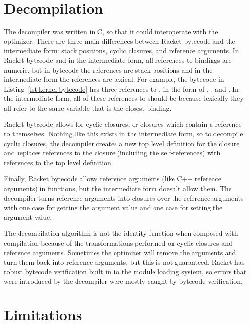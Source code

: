 \section{Decompilation}

The decompiler was written in C, so that it could interoperate with the optimizer.
There are three main differences between Racket bytecode and the intermediate form: stack positions, cyclic closures, and reference arguments.
In Racket bytecode and in the intermediate form, all references to bindings are numeric, but in bytecode the references are stack positions and in the intermediate form the references are lexical.
For example, the bytecode in Listing~\ref{lst:kernel-bytecode} has three references to , in the form of , , and . 
In the intermediate form, all of these references to  should be  because lexically they all refer to the same variable that is the closest binding.

Racket bytecode allows for cyclic closures, or closures which contain a reference to themselves.
Nothing like this exists in the intermediate form, so to decompile cyclic closures, the decompiler creates a new top level definition for the closure and replaces references to the closure (including the self-references) with references to the top level definition.

Finally, Racket bytecode allows reference arguments (like C++ reference arguments) in functions, but the intermediate form doesn't allow them.
The decompiler turns reference arguments into  closures over the reference arguments with one case for getting the argument value and one case for setting the argument value. 

The decompilation algorithm is not the identity function when composed with compilation because of the transformations performed on cyclic closures and reference arguments.
Sometimes the optimizer will remove the  arguments and turn them back into reference arguments, but this is not guaranteed. 
Racket has robust bytecode verification built in to the module loading system, so errors that were introduced by the decompiler were mostly caught by bytecode verification.

\section{Limitations}

